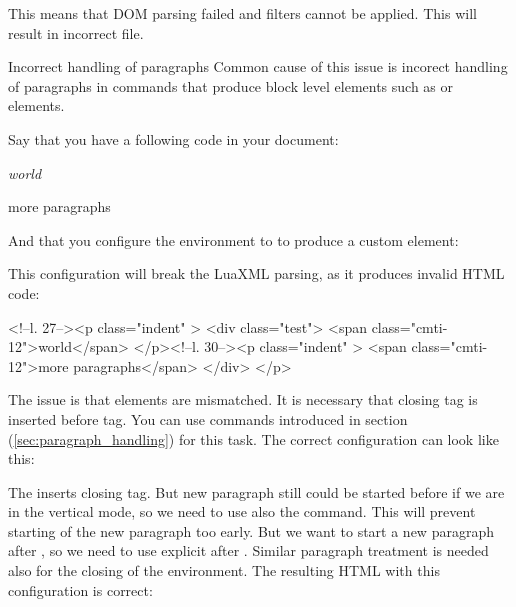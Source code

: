 This means that DOM parsing failed and filters cannot be applied. This will result in incorrect file.

\begin{issue}{Incorrect handling of paragraphs}
Common cause of this issue is incorect handling of paragraphs in commands that produce block level
elements such as  or  elements.

Say that you have a following code in your document:

\begin{texsource}
\newenvironment{test}{\itshape}{}

\begin{test}
world

more paragraphs
\end{test}
\end{texsource}

And that you configure the  environment to to produce a custom  element:

\begin{texsource}
\end{texsource}

This configuration will break the LuaXML parsing, as it produces invalid HTML code:

\begin{htmlsource}
<!--l. 27--><p class="indent" >   <div class="test"> <span 
class="cmti-12">world</span>
</p><!--l. 30--><p class="indent" >   <span 
class="cmti-12">more paragraphs</span>
</div>
</p>
\end{htmlsource}

The issue is that  elements are mismatched. It is necessary that closing  tag
is inserted before  tag. You can use commands introduced in section  
(\ref{sec:paragraph_handling}) for this task. The correct configuration can look like this:

\begin{texsource}
{\ifvmode\IgnorePar\fi\EndP{}\par}{}{}
\end{texsource}

The \texcommand{\EndP} inserts closing  tag. But new paragraph still could be started before 
 if we are in the vertical mode, so we need to use also the \texcommand{\ifvmode\IgnorePar\fi}
command. This will prevent starting of the new paragraph too early. But we want to start a new paragraph after 
, so we need to use explicit \texcommand{\par} after \texcommand{\HCode}. Similar paragraph 
treatment is needed also for the closing of the environment. The resulting HTML with this configuration is correct:


\end{issue}
